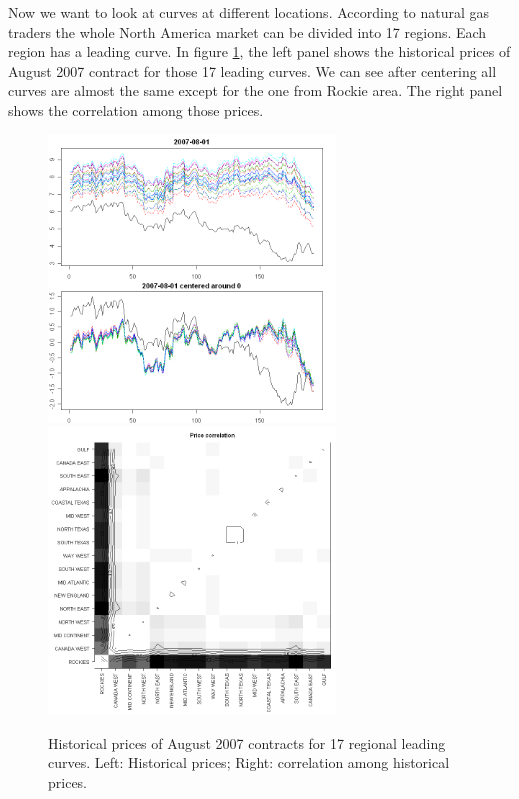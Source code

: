 Now we want to look at curves at different locations. 
According to natural gas traders the whole North America
market can be divided into 17 regions. Each region has 
a leading curve. In figure \ref{ng-region-hist}, the left panel shows the 
historical prices of August 2007 contract 
for those 17 leading curves. We can see after centering
all curves are almost the same except for the one from
Rockie area. The right panel shows the correlation
among those prices. 
\begin{figure}[htbp]
\centering
\includegraphics[width=3in, height=3in]{figures/regional-0708-01.png}
\includegraphics[width=3in, height=3in]{figures/regional-0708-02.png}
\caption{Historical prices of August 2007 contracts
for 17 regional leading curves. 
Left: Historical prices; Right: correlation among historical prices.}
\label{ng-region-hist}
\end{figure}



